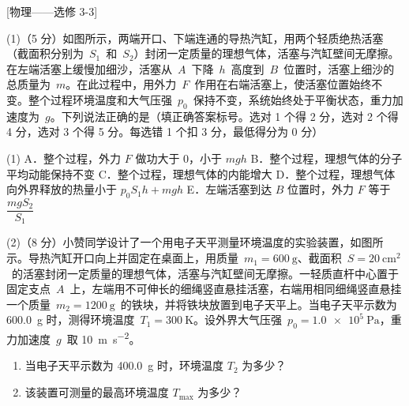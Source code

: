 \begin{question}
[物理——选修 3-3]

(1)（5 分）如图所示，两端开口、下端连通的导热汽缸，用两个轻质绝热活塞（截面积分别为~$S_{1}$~和~$S_{2}$）封闭一定质量的理想气体，活塞与汽缸壁间无摩擦。在左端活塞上缓慢加细沙，活塞从~$A$~下降~$h$~高度到~$B$~位置时，活塞上细沙的总质量为~$m$。在此过程中，用外力~$F$~作用在右端活塞上，使活塞位置始终不变。整个过程环境温度和大气压强~$p_{0}$~保持不变，系统始终处于平衡状态，重力加速度为~$g$。下列说法正确的是\gkblank（填正确答案标号。选对 1 个得 2 分，选对 2 个得 4 分，选对 3 个得 5 分。每选错 1 个扣 3 分，最低得分为 0 分）


\begin{gkopts}(1)
  \task A．整个过程，外力 $F$ 做功大于 0，小于 $mgh$
  \task B．整个过程，理想气体的分子平均动能保持不变
  \task C．整个过程，理想气体的内能增大
  \task D．整个过程，理想气体向外界释放的热量小于 $p_{0}S_{1}h+mgh$
  \task E．左端活塞到达 $B$ 位置时，外力 $F$ 等于 $\dfrac{mgS_{2}}{S_{1}}$
\end{gkopts}

(2)（8 分）小赞同学设计了一个用电子天平测量环境温度的实验装置，如图所示。导热汽缸开口向上并固定在桌面上，用质量~$m_{1}=\SI{600}{\gram}$、截面积~$S=\SI{20}{\centi\metre\squared}$~的活塞封闭一定质量的理想气体，活塞与汽缸壁间无摩擦。一轻质直杆中心置于固定支点~$A$~上，左端用不可伸长的细绳竖直悬挂活塞，右端用相同细绳竖直悬挂一个质量~$m_{2}=\SI{1200}{\gram}$~的铁块，并将铁块放置到电子天平上。当电子天平示数为 \SI{600.0}{\gram} 时，测得环境温度~$T_{1}=\SI{300}{\kelvin}$。设外界大气压强~$p_{0}=\SI{1.0e5}{\pascal}$，重力加速度~$g$~取 \SI{10}{\metre\per\second\squared}。


\begin{enumerate}[leftmargin=2em, label=(\roman*)]
  \item 当电子天平示数为 \SI{400.0}{\gram} 时，环境温度 $T_{2}$ 为多少？
  \item 该装置可测量的最高环境温度 $T_{\max}$ 为多少？
\end{enumerate}
\end{question}

